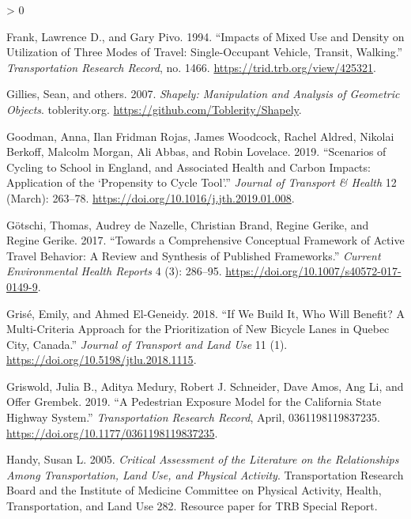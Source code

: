 \documentclass[galley]{jtlu-article-2col}
\newlength{\cslhangindent}
\newenvironment{CSLReferences}[2] %
 {%
  \setlength{\parindent}{0pt}
  \ifodd #1 \everypar{\setlength{\hangindent}{\cslhangindent}}\ignorespaces\fi
  \ifnum #2 > 0
  \setlength{\parskip}{#2\baselineskip}
  \fi
 }%
 {}
\begin{document}
\begin{CSLReferences}{1}{0}
\leavevmode\hypertarget{ref-frank_impacts_1994}{}%
Frank, Lawrence D., and Gary Pivo. 1994. {``Impacts of Mixed Use and Density on Utilization of Three Modes of Travel: {Single}-Occupant Vehicle, Transit, Walking.''} \emph{Transportation Research Record}, no. 1466. \url{https://trid.trb.org/view/425321}.

\leavevmode\hypertarget{ref-gillies_shapely_2007}{}%
Gillies, Sean, and others. 2007. \emph{Shapely: Manipulation and Analysis of Geometric Objects}. {toblerity.org}. \url{https://github.com/Toblerity/Shapely}.

\leavevmode\hypertarget{ref-goodman_scenarios_2019}{}%
Goodman, Anna, Ilan Fridman Rojas, James Woodcock, Rachel Aldred, Nikolai Berkoff, Malcolm Morgan, Ali Abbas, and Robin Lovelace. 2019. {``Scenarios of Cycling to School in {England}, and Associated Health and Carbon Impacts: {Application} of the {`{Propensity} to {Cycle Tool}'}.''} \emph{Journal of Transport \& Health} 12 (March): 263--78. \url{https://doi.org/10.1016/j.jth.2019.01.008}.

\leavevmode\hypertarget{ref-gotschi_comprehensive_2017}{}%
Götschi, Thomas, Audrey de Nazelle, Christian Brand, Regine Gerike, and Regine Gerike. 2017. {``Towards a {Comprehensive Conceptual Framework} of {Active Travel Behavior}: A {Review} and {Synthesis} of {Published Frameworks}.''} \emph{Current Environmental Health Reports} 4 (3): 286--95. \url{https://doi.org/10.1007/s40572-017-0149-9}.

\leavevmode\hypertarget{ref-grise_if_2018}{}%
Grisé, Emily, and Ahmed El-Geneidy. 2018. {``If We Build It, Who Will Benefit? {A} Multi-Criteria Approach for the Prioritization of New Bicycle Lanes in {Quebec City}, {Canada}.''} \emph{Journal of Transport and Land Use} 11 (1). \url{https://doi.org/10.5198/jtlu.2018.1115}.

\leavevmode\hypertarget{ref-griswold_pedestrian_2019}{}%
Griswold, Julia B., Aditya Medury, Robert J. Schneider, Dave Amos, Ang Li, and Offer Grembek. 2019. {``A Pedestrian Exposure Model for the California State Highway System.''} \emph{Transportation Research Record}, April, 0361198119837235. \url{https://doi.org/10.1177/0361198119837235}.

\leavevmode\hypertarget{ref-handy_critical_2005}{}%
Handy, Susan L. 2005. \emph{Critical Assessment of the Literature on the Relationships Among Transportation, Land Use, and Physical Activity}. Transportation Research Board and the Institute of Medicine Committee on Physical Activity, Health, Transportation, and Land Use 282. {Resource paper for TRB Special Report}.


\end{CSLReferences}
\end{document}
